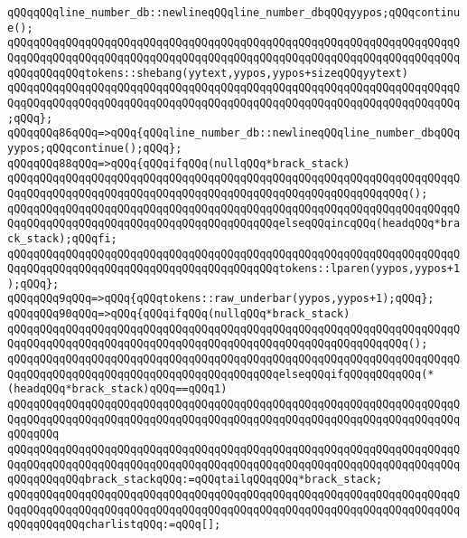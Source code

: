 \verb|qQQqqQQqline_number_db::newlineqQQqline_number_dbqQQqyypos;qQQqcontinue();|\newline
\verb|qQQqqQQqqQQqqQQqqQQqqQQqqQQqqQQqqQQqqQQqqQQqqQQqqQQqqQQqqQQqqQQqqQQqqQQqqQQqqQQqqQQqqQQqqQQqqQQqqQQqqQQqqQQqqQQqqQQqqQQqqQQqqQQqqQQqqQQqqQQqqQQqqQQqqQQqtokens::shebang(yytext,yypos,yypos+sizeqQQqyytext)|\newline
\verb|qQQqqQQqqQQqqQQqqQQqqQQqqQQqqQQqqQQqqQQqqQQqqQQqqQQqqQQqqQQqqQQqqQQqqQQqqQQqqQQqqQQqqQQqqQQqqQQqqQQqqQQqqQQqqQQqqQQqqQQqqQQqqQQqqQQqqQQqqQQq;qQQq};|\newline
\verb|qQQqqQQq86qQQq=>qQQq{qQQqline_number_db::newlineqQQqline_number_dbqQQqyypos;qQQqcontinue();qQQq};|\newline
\verb|qQQqqQQq88qQQq=>qQQq{qQQqifqQQq(nullqQQq*brack_stack)|\newline
\verb|qQQqqQQqqQQqqQQqqQQqqQQqqQQqqQQqqQQqqQQqqQQqqQQqqQQqqQQqqQQqqQQqqQQqqQQqqQQqqQQqqQQqqQQqqQQqqQQqqQQqqQQqqQQqqQQqqQQqqQQqqQQqqQQqqQQq();|\newline
\verb|qQQqqQQqqQQqqQQqqQQqqQQqqQQqqQQqqQQqqQQqqQQqqQQqqQQqqQQqqQQqqQQqqQQqqQQqqQQqqQQqqQQqqQQqqQQqqQQqqQQqqQQqqQQqqQQqelseqQQqincqQQq(headqQQq*brack_stack);qQQqfi;|\newline
\verb|qQQqqQQqqQQqqQQqqQQqqQQqqQQqqQQqqQQqqQQqqQQqqQQqqQQqqQQqqQQqqQQqqQQqqQQqqQQqqQQqqQQqqQQqqQQqqQQqqQQqqQQqqQQqqQQqtokens::lparen(yypos,yypos+1);qQQq};|\newline
\verb|qQQqqQQq9qQQq=>qQQq{qQQqtokens::raw_underbar(yypos,yypos+1);qQQq};|\newline
\verb|qQQqqQQq90qQQq=>qQQq{qQQqifqQQq(nullqQQq*brack_stack)|\newline
\verb|qQQqqQQqqQQqqQQqqQQqqQQqqQQqqQQqqQQqqQQqqQQqqQQqqQQqqQQqqQQqqQQqqQQqqQQqqQQqqQQqqQQqqQQqqQQqqQQqqQQqqQQqqQQqqQQqqQQqqQQqqQQqqQQqqQQq();|\newline
\verb|qQQqqQQqqQQqqQQqqQQqqQQqqQQqqQQqqQQqqQQqqQQqqQQqqQQqqQQqqQQqqQQqqQQqqQQqqQQqqQQqqQQqqQQqqQQqqQQqqQQqqQQqqQQqqQQqelseqQQqifqQQqqQQqqQQq(*(headqQQq*brack_stack)qQQq==qQQq1)|\newline
\verb|qQQqqQQqqQQqqQQqqQQqqQQqqQQqqQQqqQQqqQQqqQQqqQQqqQQqqQQqqQQqqQQqqQQqqQQqqQQqqQQqqQQqqQQqqQQqqQQqqQQqqQQqqQQqqQQqqQQqqQQqqQQqqQQqqQQqqQQqqQQqqQQqqQQq|\newline
\verb|qQQqqQQqqQQqqQQqqQQqqQQqqQQqqQQqqQQqqQQqqQQqqQQqqQQqqQQqqQQqqQQqqQQqqQQqqQQqqQQqqQQqqQQqqQQqqQQqqQQqqQQqqQQqqQQqqQQqqQQqqQQqqQQqqQQqqQQqqQQqqQQqqQQqqQQqbrack_stackqQQq:=qQQqtailqQQqqQQq*brack_stack;|\newline
\verb|qQQqqQQqqQQqqQQqqQQqqQQqqQQqqQQqqQQqqQQqqQQqqQQqqQQqqQQqqQQqqQQqqQQqqQQqqQQqqQQqqQQqqQQqqQQqqQQqqQQqqQQqqQQqqQQqqQQqqQQqqQQqqQQqqQQqqQQqqQQqqQQqqQQqqQQqcharlistqQQq:=qQQq[];|\newline
